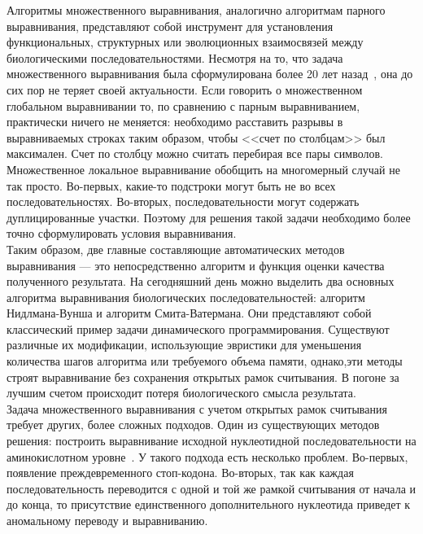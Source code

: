 \indent Алгоритмы множественного выравнивания, аналогично алгоритмам парного выравнивания, представляют собой инструмент для установления функциональных, структурных или эволюционных взаимосвязей между биологическими последовательностями.  Несмотря на то, что задача множественного выравнивания была сформулирована более 20 лет назад~\cite{SIAM_Journal}, она до сих пор не теряет своей актуальности. Если говорить о множественном глобальном выравнивании то, по сравнению с парным выравниванием, практически ничего не меняется: необходимо расставить разрывы в выравниваемых строках таким образом, чтобы <<счет по столбцам>> был максимален. Счет по столбцу можно считать перебирая все пары символов. Множественное локальное выравнивание обобщить на многомерный случай не так просто. Во-первых, какие-то подстроки могут быть не во всех последовательностях. Во-вторых, последовательности могут содержать дуплицированные участки. Поэтому для решения такой задачи необходимо более точно сформулировать условия выравнивания.\\ 
\indent Таким образом, две главные составляющие автоматических методов выравнивания --- это непосредственно алгоритм и функция оценки качества полученного результата. На сегодняшний день можно выделить два основных алгоритма выравнивания биологических последовательностей: алгоритм Нидлмана-Вунша и алгоритм Смита-Ватермана. Они представляют собой классический пример задачи динамического программирования. Существуют различные их модификации, использующие эвристики для уменьшения количества шагов алгоритма или требуемого объема памяти, однако,эти методы строят выравнивание без сохранения открытых рамок считывания. В погоне за лучшим счетом происходит потеря биологического смысла результата.\\ 
\indent Задача множественного выравнивания с учетом открытых рамок считывания требует других, более сложных подходов. Один из существующих методов решения: построить выравнивание исходной нуклеотидной последовательности на аминокислотном уровне~\cite{MACSE}. У такого подхода есть несколько проблем. Во-первых, появление преждевременного стоп-кодона. Во-вторых, так как каждая последовательность переводится с одной и той же рамкой считывания от начала и до конца, то присутствие единственного дополнительного нуклеотида приведет к аномальному переводу и выравниванию.